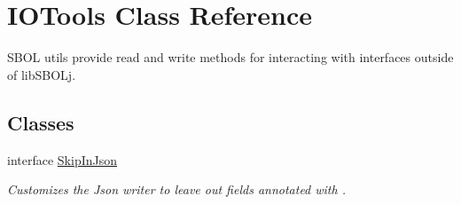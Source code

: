 \hypertarget{classorg_1_1sbolstandard_1_1lib_s_b_o_lj_1_1_i_o_tools}{
\section{IOTools Class Reference}
\label{classorg_1_1sbolstandard_1_1lib_s_b_o_lj_1_1_i_o_tools}
}


SBOL utils provide read and write methods for interacting with interfaces outside of libSBOLj.  


\subsection*{Classes}
\begin{DoxyCompactItemize}
\item 
interface \hyperlink{interfaceorg_1_1sbolstandard_1_1lib_s_b_o_lj_1_1_i_o_tools_1_1_skip_in_json}{SkipInJson}
\begin{DoxyCompactList}\small\item\em Customizes the Json writer to leave out fields annotated with . \item\end{DoxyCompactList}\end{DoxyCompactItemize}
